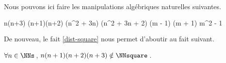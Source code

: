 Nous pouvons ici faire les manipulations algébriques naturelles suivantes.

\medskip

\begin{stepcalc}[style = sar]
	\explnext{}
		n(n+3) \cdot (n+1)(n+2)
	\explnext{}
		(n^2 + 3n) \cdot (n^2 + 3n + 2)
		(m - 1) (m + 1)
	\explnext{}
		m^2 - 1
	\end{stepcalc}

\medskip

De nouveau, le fait \ref{dist-square} nous permet d'aboutir au fait suivant. 

\begin{fact}
	 $\forall n \in \NNs$\,, $n(n+1)(n+2)(n+3) \notin \NNsquare$\,.
\end{fact}
